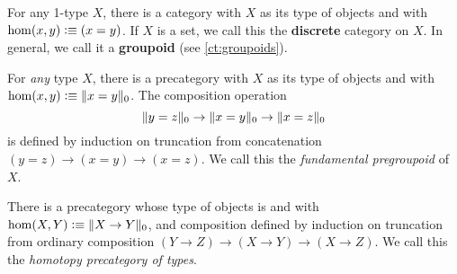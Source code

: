 \begin{eg}\label{ct:discrete}
  For any 1-type $X$, there is a category with $X$ as its type of objects and with $\hom(x,y) \vcentcolon\equiv (x=y)$.
  If $X$ is a set, we call this the \textbf{discrete} category on $X$.
  In general, we call it a \textbf{groupoid} (see \autoref{ct:groupoids}).
\end{eg}

\begin{eg}\label{ct:fundgpd}
  For \emph{any} type $X$, there is a precategory with $X$ as its type of objects and with $\hom(x,y) \vcentcolon\equiv \Vert x=y\Vert_{0}$.
  The composition operation
  \[ \Vert y=z\Vert_{0} \to \Vert x=y\Vert_{0} \to \Vert x=z\Vert_{0} \]
  is defined by induction on truncation from concatenation $(y=z)\to(x=y)\to(x=z)$.
  We call this the \emph{fundamental pregroupoid} of $X$.
\end{eg}

\begin{eg}\label{ct:hoprecat}
  There is a precategory whose type of objects is \type and with $\hom(X,Y) \vcentcolon\equiv \Vert X\to Y\Vert_{0}$, and composition defined by induction on truncation from ordinary composition $(Y\to Z) \to (X\to Y) \to (X\to Z)$.
  We call this the \emph{homotopy precategory of types}.
\end{eg}

